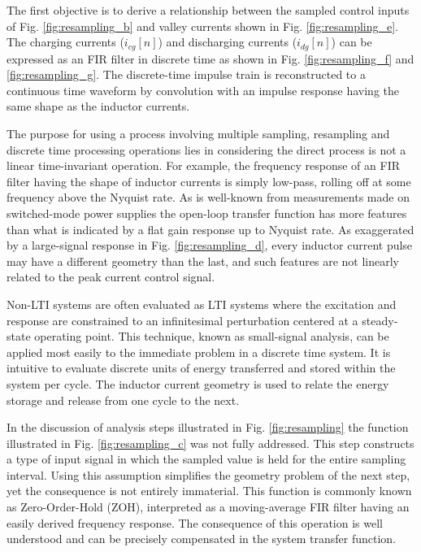 \documentclass[conference]{IEEEtran}
\begin{document}
The first objective is to derive a relationship between the sampled control inputs of Fig. \ref{fig:resampling_b} and valley currents shown in Fig. \ref{fig:resampling_e}. The charging currents ($i_{cg}[n]$) and discharging currents ($i_{dg}[n]$) can be expressed as an FIR filter in discrete time as shown in Fig. \ref{fig:resampling_f} and \ref{fig:resampling_g}. The discrete-time impulse train is reconstructed to a continuous time waveform by convolution with an impulse response having the same shape as the inductor currents.

The purpose for using a process involving multiple sampling, resampling and discrete time processing operations lies in considering the direct process is not a linear time-invariant operation. For example, the frequency response of an FIR filter having the shape of inductor currents is simply low-pass, rolling off at some frequency above the Nyquist rate. As is well-known from measurements made on switched-mode power supplies the open-loop transfer function has more features than what is indicated by a flat gain response up to Nyquist rate. As exaggerated by a large-signal response in Fig. \ref{fig:resampling_d}, every inductor current pulse may have a different geometry than the last, and such features are not linearly related to the peak current control signal. 

Non-LTI systems are often evaluated as LTI systems where the excitation and response are constrained to an infinitesimal perturbation centered at a steady-state operating point. This technique, known as small-signal analysis, can be applied most easily to the immediate problem in a discrete time system.  It is intuitive to evaluate discrete units of energy transferred and stored within the system per cycle. The inductor current geometry is used to relate the energy storage and release from one cycle to the next.

In the discussion of analysis steps illustrated in Fig. \ref{fig:resampling} the function illustrated in Fig. \ref{fig:resampling_c} was not fully addressed.  This step constructs a type of input signal in which the sampled value is held for the entire sampling interval. Using this assumption simplifies the geometry problem of the next step, yet the consequence is not entirely immaterial. This function is commonly known as Zero-Order-Hold (ZOH), interpreted as a moving-average FIR filter having an easily derived frequency response. The consequence of this operation is well understood and can be precisely compensated in the system transfer function.
\end{document}
